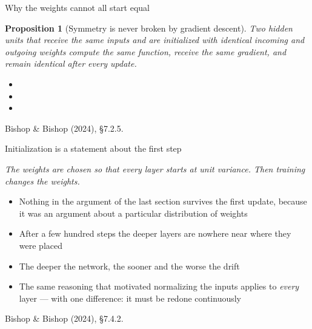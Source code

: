 \documentclass[aspectratio=169, 11pt]{beamer}
\newtheorem{propx}[theorem]{Proposition}
\newcommand{\bridge}[1]{%
  {\scriptsize\itshape\color{mcMuted} #1\par}\vspace{0.35em}}
\newcommand{\srcline}[1]{%
  \par\vspace{0.25em}%
  {\scriptsize\color{mcMuted}\hfill #1\par}}
\newcommand{\src}[3]{}      %
\begin{document}
\begin{frame}{Why the weights cannot all start equal}
  \src{bishop2024}{section}{7.2.5}
  \vspace{-0.35em}
  \begin{propx}[Symmetry is never broken by gradient descent]\label{th:sym}
    \small
    Two hidden units that receive the same inputs and are initialized
    with identical incoming and outgoing weights compute the same
    function, receive the same gradient, and remain identical after
    every update.
  \end{propx}
  {\footnotesize
  \begin{itemize}\itemsep0.28em
    \item {}
    \item {}
    \item {}
  \end{itemize}}
  \vspace{-0.3em}
  \srcline{Bishop \& Bishop (2024), \S7.2.5.}
\end{frame}

\begin{frame}{Initialization is a statement about the first step}
  \src{bishop2024}{section}{7.4.2}
  \bridge{The weights are chosen so that every layer starts at unit
  variance. Then training changes the weights.}
  \vspace{0.4em}
  \begin{itemize}\itemsep0.42em
    \item Nothing in the argument of the last section survives the first
          update, because it was an argument about a particular
          distribution of weights
    \item After a few hundred steps the deeper layers are nowhere near
          where they were placed
    \item The deeper the network, the sooner and the worse the drift
    \item The same reasoning that motivated normalizing the inputs
          applies to \emph{every} layer --- with one difference: it must
          be redone continuously
  \end{itemize}
  \srcline{Bishop \& Bishop (2024), \S7.4.2.}
\end{frame}
\end{document}
